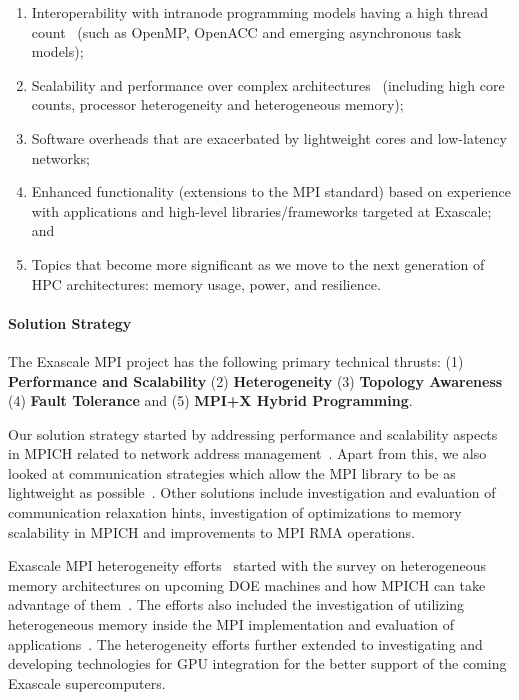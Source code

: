\begin{enumerate}

\item Interoperability with intranode programming models having a high
  thread count~\cite{Hybrid1, Hybrid2, FT2} (such as OpenMP,
  OpenACC and emerging asynchronous task models);

\item Scalability and performance over complex
  architectures~\cite{FT2, Perf1, Perf2, Perf4} (including high core
  counts, processor heterogeneity and heterogeneous memory);

\item Software overheads that are exacerbated by lightweight cores and
  low-latency networks;

\item Enhanced functionality (extensions to the MPI standard) based on
  experience with applications and high-level libraries/frameworks
  targeted at Exascale; and

\item Topics that become more significant as we move to the next
  generation of HPC architectures: memory usage, power, and
  resilience.

\end{enumerate}

\paragraph{Solution Strategy}

The Exascale MPI project has the following primary technical thrusts:
(1) \textbf{Performance and Scalability} (2) \textbf{Heterogeneity}
(3) \textbf{Topology Awareness} (4) \textbf{Fault Tolerance} and (5)
\textbf{MPI+X Hybrid Programming}.

Our solution strategy started by addressing performance and
scalability aspects in MPICH related to network address
management~\cite{memscal}.  Apart from this, we also looked at
communication strategies which allow the MPI library to be as
lightweight as possible~\cite{ch41, ch42}. Other solutions include
investigation and evaluation of communication relaxation hints,
investigation of optimizations to memory scalability in MPICH and
improvements to MPI RMA operations.

Exascale MPI heterogeneity efforts~\cite{Hetero1, Hetero2, Hetero3}
started with the survey on heterogeneous memory architectures on
upcoming DOE machines and how MPICH can take advantage of
them~\cite{hexe}. The efforts also included the investigation of
utilizing heterogeneous memory inside the MPI implementation and
evaluation of applications~\cite{hetero4}. The heterogeneity efforts
further extended to investigating and developing technologies for GPU
integration for the better support of the coming Exascale
supercomputers.

